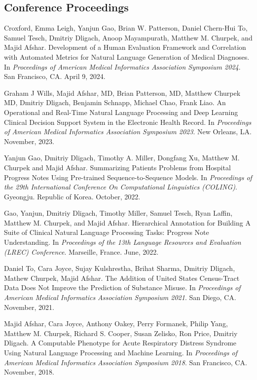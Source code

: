 \documentclass[letterpaper]{article}
\renewenvironment{itemize}{
  \begin{list}{}{
    \setlength{\leftmargin}{1.5em}
  }
}{
  \end{list}
}
\begin{document}
\subsection*{Conference Proceedings}

\begin{itemize}
\item Croxford, Emma Leigh, Yanjun Gao, Brian W. Patterson, Daniel Chern-Hui To, Samuel Tesch, Dmitriy Dligach, Anoop Mayampurath, Matthew M. Churpek, and Majid Afshar. Development of a Human Evaluation Framework and Correlation with Automated Metrics for Natural Language Generation of Medical Diagnoses. In \emph{Proceedings of American Medical Informatics Association Symposium 2024}. San Francisco, CA. April 9, 2024.
\item Graham J Wills, Majid Afshar, MD, Brian Patterson, MD, Matthew Churpek MD, Dmitriy Dligach, Benjamin Schnapp, Michael Chao, Frank Liao. An Operational and Real-Time Natural Language Processing and Deep Learning Clinical Decision Support System in the Electronic Health Record. In \emph{Proceedings of American Medical Informatics Association Symposium 2023}. New Orleans, LA. November, 2023.
\item Yanjun Gao, Dmitriy Dligach, Timothy A. Miller, Dongfang Xu, Matthew M. Churpek and Majid Afshar. Summarizing Patients Problems from Hospital Progress Notes Using Pre-trained Sequence-to-Sequence Models. In \emph{Proceedings of the 29th International Conference On Computational Linguistics (COLING)}. Gyeongju. Republic of Korea. October, 2022.
\item Gao, Yanjun, Dmitriy Dligach, Timothy Miller, Samuel Tesch, Ryan Laffin, Matthew M. Churpek, and Majid Afshar. Hierarchical Annotation for Building A Suite of Clinical Natural Language Processing Tasks: Progress Note Understanding. In \emph{Proceedings of the 13th Language Resources and Evaluation (LREC) Conference}. Marseille, France. June, 2022.
\item Daniel To, Cara Joyce, Sujay Kulshrestha, Brihat Sharma, Dmitriy Dligach, Mathew Churpek, Majid Afshar. The Addition of United States Census-Tract Data Does Not Improve the Prediction of Substance Misuse. In \emph{Proceedings of American Medical Informatics Association Symposium 2021}. San Diego, CA. November, 2021.
\item Majid Afshar, Cara Joyce, Anthony Oakey, Perry Formanek, Philip Yang, Matthew M. Churpek, Richard S. Cooper, Susan Zelisko, Ron Price, Dmitriy Dligach. A Computable Phenotype for Acute Respiratory Distress Syndrome Using Natural Language Processing and Machine Learning. In \emph{Proceedings of American Medical Informatics Association Symposium 2018}. San Francisco, CA. November, 2018.

\end{itemize}
\end{document}
